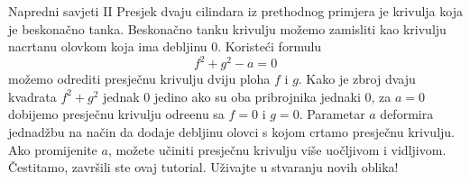 \begin{surferPage}{Napredni savjeti II}
Presjek dvaju cilindara iz prethodnog primjera je krivulja koja je beskona\v cno tanka. Beskona\v cno tanku krivulju mo\v zemo zamisliti kao krivulju nacrtanu olovkom koja ima debljinu 0. Koriste\' ci formulu
\[ f^2+g^2-a=0\]
mo\v zemo odrediti presje\v cnu krivulju dviju ploha $f$ i $g$. Kako je zbroj dvaju kvadrata $f^2+g^2$ jednak $0$ jedino ako su oba pribrojnika jednaki $0$, za $a=0$ dobijemo presje\v cnu krivulju odre\dj enu sa $f=0$ i $g=0$.
Parametar $a$ deformira jednad\v zbu na na\v cin da dodaje debljinu olovci s kojom crtamo presje\v cnu krivulju. Ako promijenite $a$, mo\v zete u\v ciniti presje\v cnu krivulju vi\v se uo\v cljivom i vidljivom.
\newline \newline
\v Cestitamo, zavr\v sili ste ovaj tutorial. U\v zivajte u stvaranju novih oblika!
\end{surferPage}
